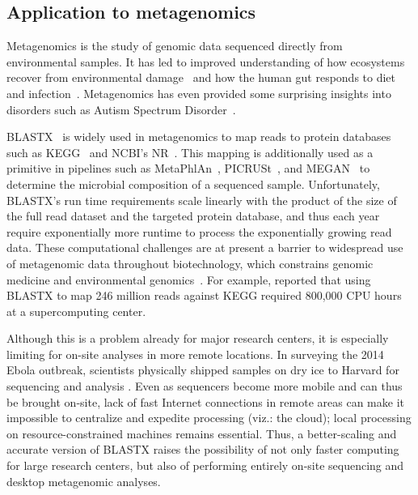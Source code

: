 \documentclass[review,preprint,12pt]{elsarticle}
\renewcommand{\cite}{\citep} %
\theoremstyle{definition}
\theoremstyle{remark}
\numberwithin{equation}{section}
\begin{document}
%

\subsection{Application to metagenomics}

Metagenomics is the study of genomic data sequenced directly from environmental
samples.
It has led to improved understanding of how ecosystems recover
from environmental damage~\cite{tyson2004community} and how the human gut responds 
to diet
and infection~\cite{david2014host}.
Metagenomics has even provided some surprising insights into disorders 
such as Autism Spectrum Disorder~\cite{macfabe2012short}.

BLASTX~\cite{altschul1990basic} is widely used in metagenomics to map
reads to protein databases such as KEGG~\cite{kanehisa2000kegg} and NCBI's 
NR~\cite{sayers2011database}.
This mapping is additionally used as a primitive in pipelines such as MetaPhlAn~\cite{segata2012metagenomic}, 
PICRUSt~\cite{langille2013predictive}, and MEGAN~\cite{huson2011integrative} to
determine the microbial composition of a sequenced sample.
Unfortunately, BLASTX's run time requirements scale linearly with the product 
of the size of the full read dataset and the targeted protein database, and 
thus each year require exponentially more runtime to process the exponentially 
growing read data. 
These computational challenges are at present a barrier to widespread use of 
metagenomic data throughout biotechnology, which constrains genomic medicine 
and environmental genomics~\cite{frank2008gastrointestinal}.
For example, \citet{mackelprang2011metagenomic} reported that using BLASTX to map 246
million reads against KEGG required 800,000 CPU hours at a supercomputing 
center.

Although this is a problem already for major research centers, it is especially
limiting for on-site analyses in more remote locations.
In surveying the 2014 Ebola outbreak, scientists physically shipped samples on 
dry ice to Harvard for sequencing and analysis \cite{gire2014genomic}.
Even as sequencers become more mobile and can thus be brought on-site, lack of fast Internet connections in remote
areas can make it impossible to centralize and expedite processing (viz.: the cloud);
local processing on resource-constrained machines remains essential.
Thus, a better-scaling and accurate version of BLASTX raises the possibility of 
not only faster computing for large research centers, but also of performing
entirely on-site sequencing and desktop metagenomic analyses.
\end{document}
